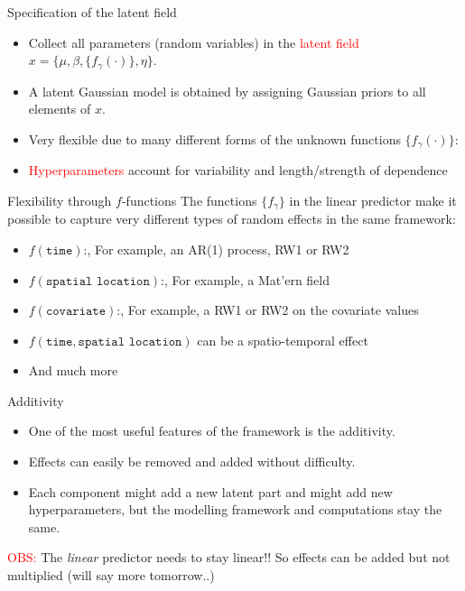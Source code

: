 \documentclass[
  ignorenonframetext,
]{beamer}
\providecommand{\tightlist}{%
  \setlength{\itemsep}{0pt}\setlength{\parskip}{0pt}}
\begin{document}
\begin{frame}{Specification of the latent field}
\protect\hypertarget{specification-of-the-latent-field}{}
\begin{itemize}[<+->]
\tightlist
\item
  Collect all parameters (random variables) in the
  \textcolor{red}{latent field}
  \({x} =\{\mu, {\beta}, \{f_\gamma(\cdot)\}, {\eta}\}\).
\item
  A latent Gaussian model is obtained by assigning Gaussian priors to
  all elements of \({x}\).
\item
  Very flexible due to many different forms of the unknown functions
  \(\{f_\gamma(\cdot)\}\):
\item
  \textcolor{red}{Hyperparameters} account for variability and
  length/strength of dependence
\end{itemize}
\end{frame}

\begin{frame}{Flexibility through \(f\)-functions}
\protect\hypertarget{flexibility-through-f-functions}{}
The functions \(\{f_\gamma\}\) in the linear predictor make it possible
to capture very different types of random effects in the same framework:

\begin{itemize}
\tightlist
\item
  \(f(\texttt{time})\):, For example, an AR(1) process, RW1 or RW2
\item
  \(f(\texttt{spatial location})\):, For example, a Mat'ern field
\item
  \(f(\texttt{covariate})\):, For example, a RW1 or RW2 on the covariate
  values
\item
  \(f(\texttt{time}, \texttt{spatial location})\) can be a
  spatio-temporal effect
\item
  And much more
\end{itemize}
\end{frame}

\begin{frame}{Additivity}
\protect\hypertarget{additivity}{}
\begin{itemize}
\tightlist
\item
  One of the most useful features of the framework is the additivity.
\item
  Effects can easily be removed and added without difficulty.
\item
  Each component might add a new latent part and might add new
  hyperparameters, but the modelling framework and computations stay the
  same.
\end{itemize}

\pause

\textcolor{red}{OBS:} The \emph{linear} predictor needs to stay linear!!
So effects can be added but not multiplied (will say more tomorrow..)
\end{frame}
\end{document}
